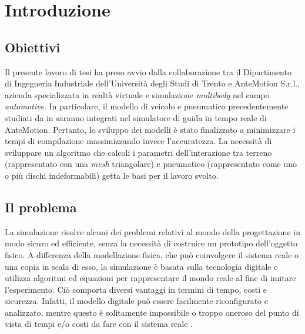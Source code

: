 \chapter{Introduzione}
\label{Introduzione}
%
\section{Obiettivi}
Il presente lavoro di tesi ha preso avvio dalla collaborazione tra il Dipartimento di Ingegneria Industriale dell'Università degli Studi di Trento e AnteMotion S.r.l., azienda specializzata in realtà virtuale e simulazione \textit{multibody} nel campo \textit{automotive}. In particolare, il modello di veicolo e pneumatico precedentemente studiati da \citeauthor{Larcher} in \cite{Larcher} saranno integrati nel simulatore di guida in tempo reale di AnteMotion. Pertanto, lo sviluppo dei modelli è stato finalizzato a minimizzare i tempi di compilazione massimizzando invece l'accuratezza. La necessità di sviluppare un algoritmo che calcoli i parametri dell'interazione tra terreno (rappresentato con una \textit{mesh} triangolare) e pneumatico (rappresentato come uno o più dischi indeformabili) getta le basi per il lavoro svolto.
%
\section{Il problema}
La simulazione risolve alcuni dei problemi relativi al mondo della progettazione in modo sicuro ed efficiente, senza la necessità di costruire un prototipo dell'oggetto fisico. A differenza della modellazione fisica, che può coinvolgere il sistema reale o una copia in scala di esso, la simulazione è basata sulla tecnologia digitale e utilizza algoritmi ed equazioni per rappresentare il mondo reale al fine di imitare l'esperimento. Ciò comporta diversi vantaggi in termini di tempo, costi e sicurezza. Infatti, il modello digitale può essere facilmente riconfigurato e analizzato, mentre questo è solitamente impossibile o troppo oneroso del punto di vista di tempi e/o costi da fare con il sistema reale \cite{Anu}.

